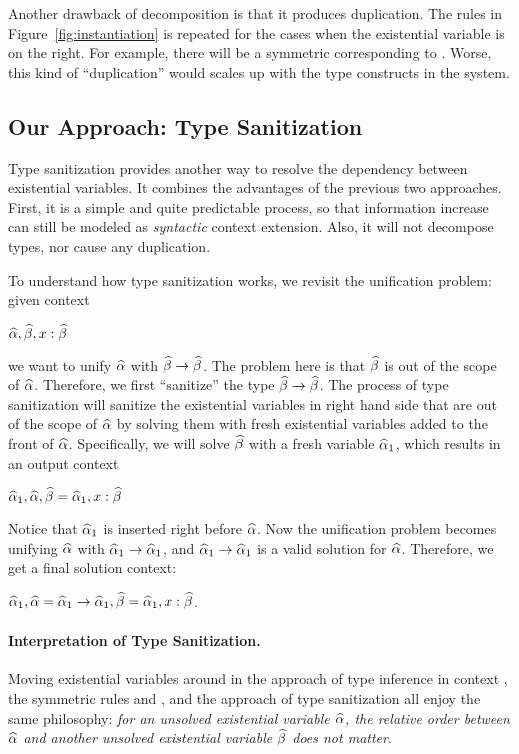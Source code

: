 Another drawback of decomposition is that it produces duplication. The rules in
Figure~\ref{fig:instantiation} is repeated for the cases when the existential
variable is on the right. For example, there will be a symmetric 
corresponding to . Worse, this kind of ``duplication'' would
scales up with the type constructs in the system.

\subsection{Our Approach: Type Sanitization}
\label{subsec:sanitization}

Type sanitization provides another way to resolve the dependency between existential
variables. It combines the advantages of the previous two approaches. First, it is a
simple and quite predictable process, so that information increase can still be
modeled as \textit{syntactic} context extension. Also, it will not decompose
types, nor cause any duplication.

To understand how type sanitization works, we revisit the unification
problem: given context

$\widehat{\alpha}, \widehat{\beta}, x: \widehat{\beta}$

\noindent we want to unify $\widehat{\alpha}$ with $\widehat{\beta} \to \widehat{\beta}$. The problem here is
that $\widehat{\beta}$ is out of the scope of $\widehat{\alpha}$. Therefore, we first ``sanitize''
the type $\widehat{\beta} \to \widehat{\beta}$. The process of type sanitization will sanitize the
existential variables in right hand side that are out of the scope of $\widehat{\alpha}$ by
solving them with fresh existential variables added to the front of $\widehat{\alpha}$.
Specifically, we will solve
$\widehat{\beta}$ with a fresh variable $\widehat{\alpha}_1$, which results in an output context

$\widehat{\alpha}_1, \widehat{\alpha}, \widehat{\beta} = \widehat{\alpha}_1, x: \widehat{\beta}$

Notice that $\widehat{\alpha}_1$ is inserted right before $\widehat{\alpha}$. Now the unification
problem becomes unifying $\widehat{\alpha}$ with $\widehat{\alpha}_1 \to \widehat{\alpha}_1$, and $\widehat{\alpha}_1 \to
\widehat{\alpha}_1$ is a valid solution for $\widehat{\alpha}$. Therefore, we get a final solution
context:

$\widehat{\alpha}_1, \widehat{\alpha} = \widehat{\alpha}_1 \to \widehat{\alpha}_1, \widehat{\beta} = \widehat{\alpha}_1, x : \widehat{\beta}$.


\paragraph{Interpretation of Type Sanitization.}
Moving existential variables around in the approach of type inference in context
\citep{gundry2010type}, the symmetric rules  and
 \citep{dunfield2013complete}, and the approach of type
sanitization all enjoy the same philosophy: \textit{for an unsolved existential
  variable $\widehat{\alpha}$, the relative order between $\widehat{\alpha}$ and another unsolved
  existential variable $\widehat{\beta}$ does not matter}.

